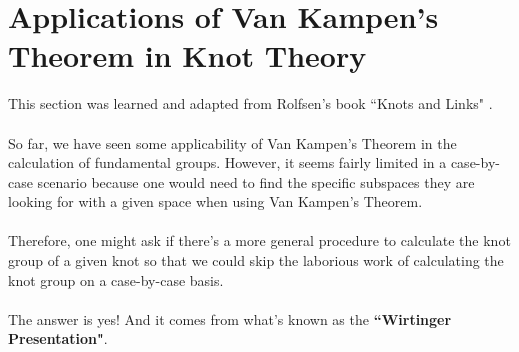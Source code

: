 \documentclass{article}
\begin{document}
\newpage
\section{Applications of Van Kampen's Theorem in Knot Theory}
This section was learned and adapted from Rolfsen's book ``Knots and Links" \cite{rolfsen_2004}.\\\\
So far, we have seen some applicability of Van Kampen's Theorem in the calculation of fundamental groups. However, it seems fairly limited in a case-by-case scenario because one would need to find the specific subspaces they are looking for with a given space when using Van Kampen's Theorem.\\\\
Therefore, one might ask if there's a more general procedure to calculate the knot group of a given knot so that we could skip the laborious work of calculating the knot group on a case-by-case basis.\\\\
The answer is yes! And it comes from what's known as the {\bf ``Wirtinger Presentation"}.
\end{document}
